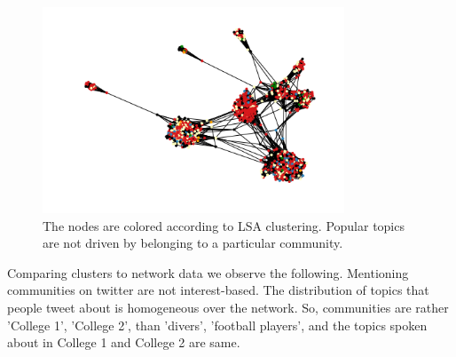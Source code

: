 \documentclass[%
 reprint,
 amsmath,amssymb,
 aps,
]{revtex4-1}
\begin{document}
\begin{figure}[htp]
\centering
\includegraphics[width=9cm]{lsa_on_graph}
\caption{The nodes are colored according to LSA clustering. Popular topics are not driven by belonging to a particular community.}
\label{fig}
\end{figure}


Comparing clusters to network data we observe the following.
Mentioning communities on twitter are not interest-based. 
The distribution of topics that people tweet about is homogeneous over the network. So, communities are rather 'College 1', 'College 2', than 'divers', 'football players', and the topics spoken about in College 1 and College 2 are same.































\end{document}
